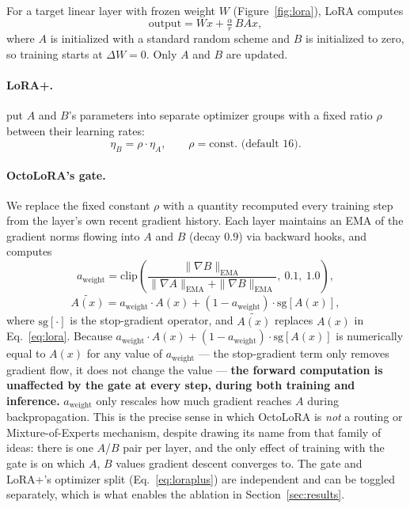 \documentclass[11pt]{article}
\begin{document}
For a target linear layer with frozen weight $W$ (Figure~\ref{fig:lora}), LoRA computes
\begin{equation}
  \text{output} = Wx + \tfrac{\alpha}{r}\,B A x,
  \label{eq:lora}
\end{equation}
where $A$ is initialized with a standard random scheme and $B$ is
initialized to zero, so training starts at $\Delta W = 0$. Only $A$ and
$B$ are updated.

\paragraph{LoRA+.} \citet{hayou2024lora} put $A$ and $B$'s parameters into
separate optimizer groups with a fixed ratio $\rho$ between their learning
rates:
\begin{equation}
  \eta_B = \rho \cdot \eta_A, \qquad \rho = \text{const. (default 16)}.
  \label{eq:loraplus}
\end{equation}

\paragraph{OctoLoRA's gate.} We replace the fixed constant $\rho$ with a
quantity recomputed every training step from the layer's own recent
gradient history. Each layer maintains an EMA of the gradient norms
flowing into $A$ and $B$ (decay $0.9$) via backward hooks, and computes
\begin{equation}
  a_{\text{weight}} = \mathrm{clip}\!\left(
    \frac{\|\nabla B\|_{\text{EMA}}}{\|\nabla A\|_{\text{EMA}} + \|\nabla B\|_{\text{EMA}}},\ 0.1,\ 1.0
  \right),
  \label{eq:gate}
\end{equation}
\begin{equation}
  \widetilde{A(x)} = a_{\text{weight}} \cdot A(x) + (1 - a_{\text{weight}}) \cdot \mathrm{sg}[A(x)],
\end{equation}
where $\mathrm{sg}[\cdot]$ is the stop-gradient operator, and $\widetilde{A(x)}$
replaces $A(x)$ in Eq.~\ref{eq:lora}. Because $a_{\text{weight}} \cdot A(x) +
(1 - a_{\text{weight}}) \cdot \mathrm{sg}[A(x)]$ is numerically equal to
$A(x)$ for any value of $a_{\text{weight}}$ — the stop-gradient term only
removes gradient flow, it does not change the value — \textbf{the forward
computation is unaffected by the gate at every step, during both training
and inference.} $a_{\text{weight}}$ only rescales how much gradient reaches
$A$ during backpropagation. This is the precise sense in which OctoLoRA is
\emph{not} a routing or Mixture-of-Experts mechanism, despite drawing its
name from that family of ideas: there is one $A$/$B$ pair per layer, and
the only effect of training with the gate is on which $A$, $B$ values
gradient descent converges to. The gate and LoRA+'s optimizer split
(Eq.~\ref{eq:loraplus}) are independent and can be toggled separately,
which is what enables the ablation in Section~\ref{sec:results}.
\end{document}
